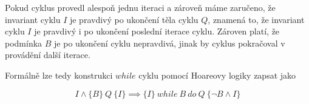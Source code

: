 Pokud cyklus provedl alespoň jednu iteraci a zároveň máme zaručeno,
že invariant cyklu $I$ je pravdivý po ukončení těla cyklu $Q$,
znamená to, že invariant cyklu $I$ je pravdivý i po ukončení poslední iterace cyklu.
Zároven platí, že podmínka $B$ je po ukončení cyklu nepravdivá, jinak by cyklus pokračoval v provádění další iterace.

Formálně lze tedy konstrukci $while$ cyklu pomocí Hoareovy logiky zapsat jako

\begin{equation*}
    I \land \{ B \} \  Q \  \{ I \} \implies \{ I \} \  while \  B \  do \  Q \  \{ \neg B \land I \}
\end{equation*}